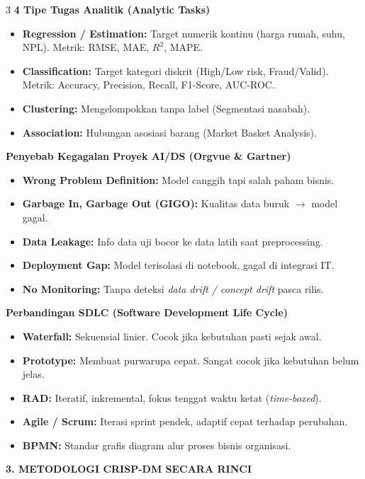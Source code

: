 \documentclass[6.8pt,landscape,a4paper]{extarticle}
\newcommand{\sdtSection}[2][sdtNavy]{%
    \vspace{0.6pt}%
    \noindent\colorbox{#1}{%
        \parbox{\dimexpr\linewidth-2\fboxsep\relax}{%
            \textbf{\fontsize{6.5pt}{7.5pt}\selectfont\color{white}#2}%
        }%
    }\vspace{0.3pt}%
}
\newcommand{\sdtSub}[1]{%
    \vspace{0.5pt}%
    \noindent\textbf{\fontsize{5.8pt}{6.8pt}\selectfont\color{sdtBlue}#1}\vspace{0.1pt}%
}
\begin{document}
\begin{multicols}{3}
\sdtSub{4 Tipe Tugas Analitik (Analytic Tasks)}
\begin{itemize}
    \item \textbf{Regression / Estimation:} Target numerik kontinu (harga rumah, suhu, NPL). Metrik: RMSE, MAE, $R^2$, MAPE.
    \item \textbf{Classification:} Target kategori diskrit (High/Low risk, Fraud/Valid). Metrik: Accuracy, Precision, Recall, F1-Score, AUC-ROC.
    \item \textbf{Clustering:} Mengelompokkan tanpa label (Segmentasi nasabah).
    \item \textbf{Association:} Hubungan asosiasi barang (Market Basket Analysis).
\end{itemize}

\sdtSub{Penyebab Kegagalan Proyek AI/DS (Orgvue \& Gartner)}
\begin{itemize}
    \item \textbf{Wrong Problem Definition:} Model canggih tapi salah paham bisnis.
    \item \textbf{Garbage In, Garbage Out (GIGO):} Kualitas data buruk $\rightarrow$ model gagal.
    \item \textbf{Data Leakage:} Info data uji bocor ke data latih saat preprocessing.
    \item \textbf{Deployment Gap:} Model terisolasi di notebook, gagal di integrasi IT.
    \item \textbf{No Monitoring:} Tanpa deteksi \textit{data drift / concept drift} pasca rilis.
\end{itemize}

\sdtSub{Perbandingan SDLC (Software Development Life Cycle)}
\begin{itemize}
    \item \textbf{Waterfall:} Sekuensial linier. Cocok jika kebutuhan pasti sejak awal.
    \item \textbf{Prototype:} Membuat purwarupa cepat. Sangat cocok jika kebutuhan belum jelas.
    \item \textbf{RAD:} Iteratif, inkremental, fokus tenggat waktu ketat (\textit{time-boxed}).
    \item \textbf{Agile / Scrum:} Iterasi sprint pendek, adaptif cepat terhadap perubahan.
    \item \textbf{BPMN:} Standar grafis diagram alur proses bisnis organisasi.
\end{itemize}



\sdtSection{3. METODOLOGI CRISP-DM SECARA RINCI}


\end{multicols}
\end{document}
